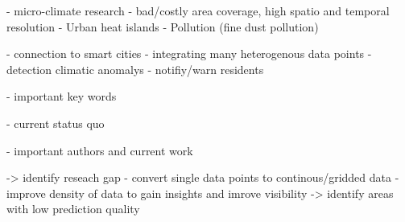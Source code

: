 - micro-climate research
    - bad/costly area coverage, high spatio and temporal resolution
    - Urban heat islands
    - Pollution (fine dust pollution)

- connection to smart cities
    - integrating many heterogenous data points
    - detection climatic anomalys
    - notifiy/warn residents

- important key words

- current status quo

- important authors and current work

-> identify reseach gap
- convert single data points to continous/gridded data
- improve density of data to gain insights and imrove visibility -> identify areas with low prediction quality
